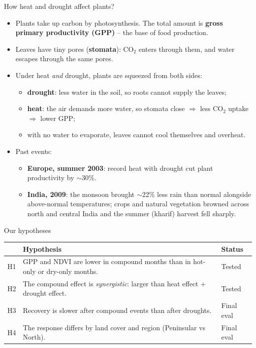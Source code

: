 \documentclass[aspectratio=169,xcolor=table]{beamer}
\begin{document}
\begin{frame}{How heat and drought affect plants?}
\small
\begin{itemize}
  \item Plants take up carbon by photosynthesis. The total amount is
    \textbf{gross primary productivity (GPP)} -- the base of food production.
  \item Leaves have tiny pores (\textbf{stomata}): CO$_2$ enters through them,
    and water escapes through the same pores.
  \item Under heat \emph{and} drought, plants are squeezed from both sides:
  \begin{itemize}
    \item \textbf{drought}: less water in the soil, so roots cannot supply the leaves;
    \item \textbf{heat}: the air demands more water, so stomata close
      $\Rightarrow$ less CO$_2$ uptake $\Rightarrow$ lower GPP;
    \item with no water to evaporate, leaves cannot cool themselves and overheat.
  \end{itemize}
   \item Past events:
  \begin{itemize}
    \item \textbf{Europe, summer 2003}: record heat with drought cut plant
      productivity by $\sim$30\%.
    \item \textbf{India, 2009}: the monsoon brought $\sim$22\% less rain than
      normal alongside above-normal temperatures; crops and natural
      vegetation browned across north and central India and the summer
      (kharif) harvest fell sharply.
  \end{itemize}
\end{itemize}
\end{frame}

\begin{frame}{Our hypotheses}
\renewcommand{\arraystretch}{1.4}
\begin{tabular}{@{}p{}>{\raggedright\arraybackslash}p{}p{}@{}}
\toprule
 & \textbf{Hypothesis} & \textbf{Status} \\
\midrule
H1 & GPP and NDVI are lower in compound months than in hot-only or dry-only months. & Tested \\
H2 & The compound effect is \emph{synergistic}: larger than heat effect + drought effect. & Tested \\
H3 & Recovery is slower after compound events than after droughts. & Final eval \\
H4 & The response differs by land cover and region (Peninsular vs North). & Final eval \\
\bottomrule
\end{tabular}

\end{frame}
\end{document}
